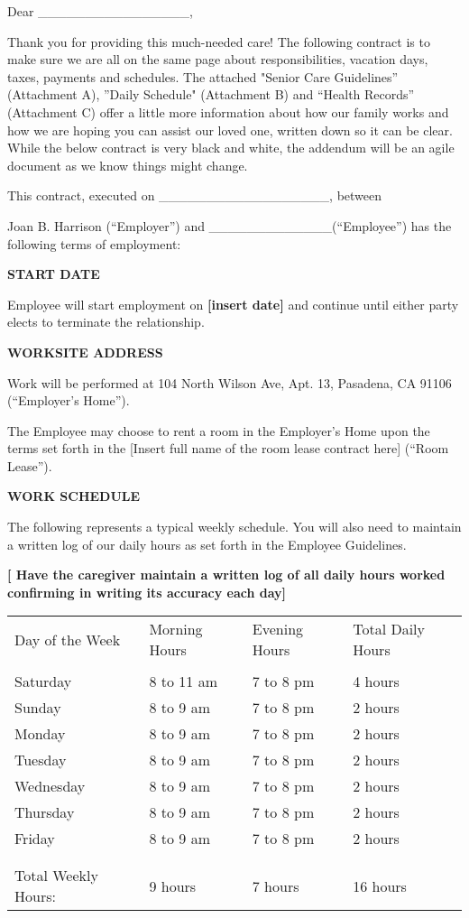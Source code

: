 \documentclass[]{article}
\date{}
\begin{document}
Dear \_\_\_\_\_\_\_\_\_\_\_\_\_\_\_\_,

Thank you for providing this much-needed care! The following contract is
to make sure we are all on the same page about responsibilities,
vacation days, taxes, payments and schedules. The attached "Senior Care
Guidelines'' (Attachment A), ''Daily Schedule" (Attachment B) and
``Health Records'' (Attachment C) offer a little more information about
how our family works and how we are hoping you can assist our loved one,
written down so it can be clear. While the below contract is very black
and white, the addendum will be an agile document as we know things
might change.

This contract, executed on \_\_\_\_\_\_\_\_\_\_\_\_\_\_\_\_\_\_, between

Joan B. Harrison (``Employer'') and
\_\_\_\_\_\_\_\_\_\_\_\_\_(``Employee'') has the following terms of
employment:

\textbf{START DATE}

Employee will start employment on \textbf{{[}insert date{]}} and
continue until either party elects to terminate the relationship.

\textbf{WORKSITE ADDRESS}

Work will be performed at 104 North Wilson Ave, Apt. 13, Pasadena, CA
91106 (``Employer's Home'').

The Employee may choose to rent a room in the Employer's Home upon the
terms set forth in the {[}Insert full name of the room lease contract
here{]} (``Room Lease'').

\textbf{WORK SCHEDULE}

The following represents a typical weekly schedule. You will also need
to maintain a written log of our daily hours as set forth in the
Employee Guidelines.

\textbf{{[} Have the caregiver maintain a written log of all daily hours
worked confirming in writing its accuracy each day{]}}

\begin{longtable}[c]{@{}llll@{}}
\toprule
Day of the Week & Morning Hours & Evening Hours & Total Daily
Hours\tabularnewline
& & &\tabularnewline
Saturday & 8 to 11 am & 7 to 8 pm & 4 hours\tabularnewline
Sunday & 8 to 9 am & 7 to 8 pm & 2 hours\tabularnewline
Monday & 8 to 9 am & 7 to 8 pm & 2 hours\tabularnewline
Tuesday & 8 to 9 am & 7 to 8 pm & 2 hours\tabularnewline
Wednesday & 8 to 9 am & 7 to 8 pm & 2 hours\tabularnewline
Thursday & 8 to 9 am & 7 to 8 pm & 2 hours\tabularnewline
Friday & 8 to 9 am & 7 to 8 pm & 2 hours\tabularnewline
& & &\tabularnewline
& & &\tabularnewline
Total Weekly Hours: & 9 hours & 7 hours & 16 hours\tabularnewline
\bottomrule
\end{longtable}
\end{document}

